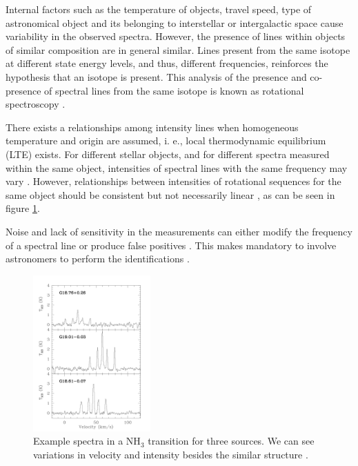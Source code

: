 Internal factors such as the temperature of objects, travel speed, type of astronomical object and its belonging to interstellar or intergalactic space \citep{sembach_far_2001} cause variability in the observed spectra.
However, the presence of lines within objects of similar composition are in general similar.
Lines present from the same isotope at different state energy levels, and thus, different frequencies, reinforces the hypothesis that an isotope is present.
This analysis of the presence and co-presence of spectral lines from the same isotope is known as rotational spectroscopy \citep{schilke_line_2001}.

There exists a relationships among intensity lines when homogeneous temperature and origin are assumed, i. e., local thermodynamic equilibrium (LTE) exists.
For different stellar objects, and for different spectra measured within the same object, intensities of spectral lines with the same frequency may vary \citep{madden_classification_2005}.
However, relationships between intensities of rotational sequences for the same object should be consistent but not necessarily linear \citep{nummelin_three-position_2000, smith_molecular_2015}, as can be seen in figure \ref{fig:spectral_lines}.

Noise and lack of sensitivity in the measurements can either modify the frequency of a spectral line or produce false positives \citep{nummelin_three-position_1998}.
This makes mandatory to involve astronomers to perform the identifications \citep{schilke_line_2001}.

\begin{figure}[H]
   	\begin{center}
   		\includegraphics[width=0.40\textwidth]{images/spectral_lines}
   		\caption{Example spectra in a NH$_3$ transition for three sources.
   			We can see variations in velocity and intensity besides the similar structure \citep{schuller_atlasgal_2009}.}
   		\label{fig:spectral_lines}
   	\end{center}

\end{figure}

